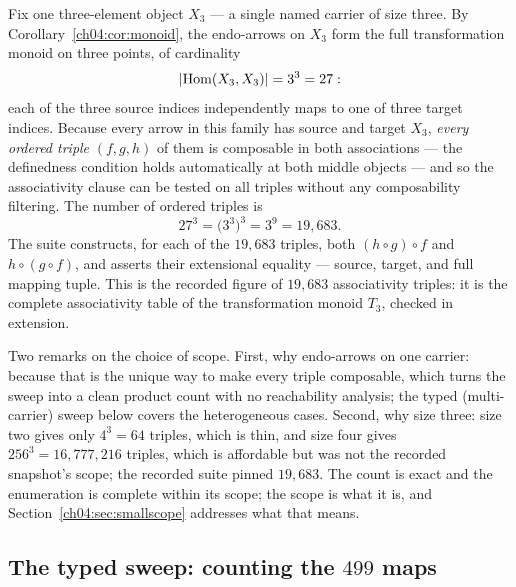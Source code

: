 Fix one three-element object $X_3$ --- a single named carrier of size three.
By Corollary~\ref{ch04:cor:monoid}, the endo-arrows on $X_3$ form the full
transformation monoid on three points, of cardinality
\[
  |{\mathrm{Hom}(X_3, X_3)}| = 3^{3} = 27:
\]
each of the three source indices independently maps to one of three target
indices. Because every arrow in this family has source and target $X_3$,
\emph{every ordered triple} $(f, g, h)$ of them is composable in both
associations --- the definedness condition holds automatically at both
middle objects --- and so the associativity clause can be tested on all
triples without any composability filtering. The number of ordered triples
is
\[
  27^{3} = \bigl(3^{3}\bigr)^{3} = 3^{9} = 19{,}683.
\]
The suite constructs, for each of the $19{,}683$ triples, both
$(h \circ g) \circ f$ and $h \circ (g \circ f)$, and asserts their
extensional equality --- source, target, and full mapping tuple. This is the
recorded figure of $19{,}683$ associativity triples: it is the complete
associativity table of the transformation monoid $T_3$, checked in extension.

Two remarks on the choice of scope. First, why endo-arrows on one carrier:
because that is the unique way to make every triple composable, which turns
the sweep into a clean product count with no reachability analysis; the
typed (multi-carrier) sweep below covers the heterogeneous cases. Second,
why size three: size two gives only $4^{3} = 64$ triples, which is thin, and
size four gives $256^{3} = 16{,}777{,}216$ triples, which is affordable but
was not the recorded snapshot's scope; the recorded suite pinned
$19{,}683$. The count is exact and the enumeration is complete within its
scope; the scope is what it is, and Section~\ref{ch04:sec:smallscope}
addresses what that means.

\subsection{The typed sweep: counting the $499$ maps}
\label{ch04:sec:typed-count}

